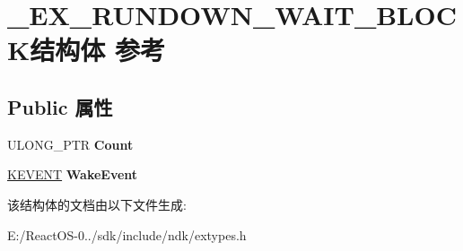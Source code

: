 \hypertarget{struct___e_x___r_u_n_d_o_w_n___w_a_i_t___b_l_o_c_k}{}\section{\+\_\+\+E\+X\+\_\+\+R\+U\+N\+D\+O\+W\+N\+\_\+\+W\+A\+I\+T\+\_\+\+B\+L\+O\+C\+K结构体 参考}
\label{struct___e_x___r_u_n_d_o_w_n___w_a_i_t___b_l_o_c_k}
\subsection*{Public 属性}
\begin{DoxyCompactItemize}
\item 
\mbox{\label{struct___e_x___r_u_n_d_o_w_n___w_a_i_t___b_l_o_c_k_aa37ff613565ac9952c814595bb1e6cae}} 
U\+L\+O\+N\+G\+\_\+\+P\+TR {\bfseries Count}
\item 
\mbox{\label{struct___e_x___r_u_n_d_o_w_n___w_a_i_t___b_l_o_c_k_ad011a00177691542b2a2d5824bddb8ef}} 
\hyperlink{struct___k_e_v_e_n_t}{K\+E\+V\+E\+NT} {\bfseries Wake\+Event}
\end{DoxyCompactItemize}


该结构体的文档由以下文件生成\+:\begin{DoxyCompactItemize}
\item 
E\+:/\+React\+O\+S-\/0../sdk/include/ndk/extypes.\+h\end{DoxyCompactItemize}
